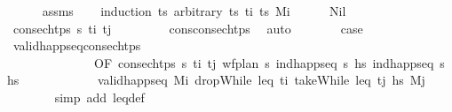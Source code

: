 \begin{isabellebody}
%
\isadelimproof
\ \ \ \ %
\endisadelimproof
%
\isatagproof
{}\isamarkupfalse%
\ assms\isanewline
\ \ \isamarkupfalse%
\ {\isacharparenleft}{\kern0pt}induction\ ts\ arbitrary{\isacharcolon}{\kern0pt}\ ts\ t\isactrlsub i\ ts\ M\isactrlsub i{\isacharparenright}{\kern0pt}\isanewline
\ \ \ \ \isamarkupfalse%
\ Nil\isanewline
\ \ \ \ \isamarkupfalse%
\ \isamarkupfalse%
\ {\isachardoublequoteopen}consec{\isacharunderscore}{\kern0pt}htps\ {\isasympi}s\ t\isactrlsub i\ t\isactrlsub j{\isachardoublequoteclose}\isanewline
\ \ \ \ \ \ \ \isamarkupfalse%
\ cons{\isacharunderscore}{\kern0pt}consec{\isacharunderscore}{\kern0pt}htps\ \isamarkupfalse%
\ auto\isanewline
\ \ \ \ \isamarkupfalse%
\ \isamarkupfalse%
\ {\isacharquery}{\kern0pt}case\isanewline
\ \ \ \ \ \ \isamarkupfalse%
\ valid{\isacharunderscore}{\kern0pt}happ{\isacharunderscore}{\kern0pt}seq{\isacharunderscore}{\kern0pt}consec{\isacharunderscore}{\kern0pt}htps\isanewline
\ \ \ \ \ \ \ \ \ \ \ \ \ \ {\isacharbrackleft}{\kern0pt}OF\ {\isacartoucheopen}consec{\isacharunderscore}{\kern0pt}htps\ {\isasympi}s\ t\isactrlsub i\ t\isactrlsub j{\isacartoucheclose}\ {\isacartoucheopen}wf{\isacharunderscore}{\kern0pt}plan\ {\isasympi}s{\isacartoucheclose}\ {\isacartoucheopen}ind{\isacharunderscore}{\kern0pt}happ{\isacharunderscore}{\kern0pt}seq\ {\isasympi}s\ hs\ {\isacartoucheopen}ind{\isacharunderscore}{\kern0pt}happ{\isacharunderscore}{\kern0pt}seq\ {\isasympi}s\ hs\isanewline
\ \ \ \ \ \ \ \ \ \ \ \ {\isacartoucheopen}valid{\isacharunderscore}{\kern0pt}happ{\isacharunderscore}{\kern0pt}seq\ M\isactrlsub i\ {\isacharparenleft}{\kern0pt}dropWhile\ {\isacharparenleft}{\kern0pt}leq\ t\isactrlsub i{\isacharparenright}{\kern0pt}\ {\isacharparenleft}{\kern0pt}takeWhile\ {\isacharparenleft}{\kern0pt}leq\ t\isactrlsub j{\isacharparenright}{\kern0pt}\ hs\ M\isactrlsub j{\isacartoucheclose}\isanewline
\ \ \ \ \ \ \isamarkupfalse%
\ {\isacharparenleft}{\kern0pt}simp\ add{\isacharcolon}{\kern0pt}\ leq{\isacharunderscore}{\kern0pt}def{\isacharparenright}{\kern0pt}\isanewline
\ \ \isamarkupfalse%
\isanewline
\ \ \ \ \isamarkupfalse%

\end{isabellebody}
